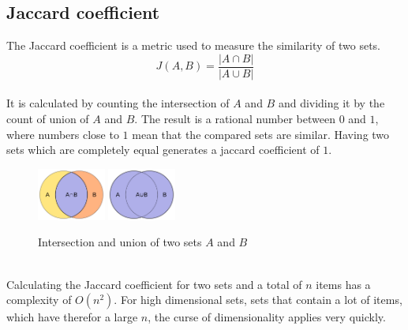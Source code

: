 \subsection{Jaccard coefficient}

The Jaccard coefficient is a metric used to measure the similarity of two sets.\\

\begin{equation}
    J(A,B) = \frac{ | A \cap B | }{ | A \cup B | }
\end{equation}\\

It is calculated by counting the intersection of $ A $ and $ B $ and dividing it by the count of union of $ A $ and $ B $. The result is a rational number between $ 0 $ and $ 1 $, where numbers close to $ 1 $ mean that the compared sets are similar. Having two sets which are completely equal generates a jaccard coefficient of $ 1 $.\\

\begin{figure}[H]
    \centering
    \includegraphics[width=0.20\textwidth]{images/Intersection_of_sets_A_and_B.png} 
    \includegraphics[width=0.20\textwidth]{images/Union_of_sets_A_and_B.png}
    \caption{Intersection and union of two sets $ A $ and $ B $ \cite{intersectionImage,unionImage}}
\end{figure}\\


Calculating the Jaccard coefficient for two sets and a total of $ n $ items has a complexity of $ O(n^2) $. For high dimensional sets, sets that contain a lot of items, which have therefor a large $ n $, the curse of dimensionality applies very quickly.\\